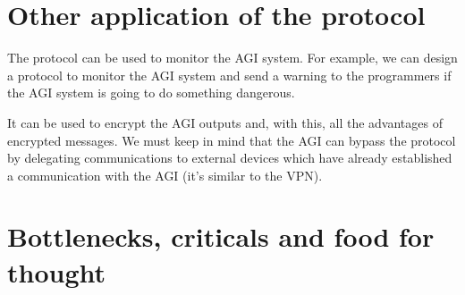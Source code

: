 \documentclass{article}
\begin{document}
\section{Other application of the protocol}
The protocol can be used to monitor the AGI system.
For example, we can design a protocol to monitor the AGI system and send a warning to the programmers if the AGI system is going to do something dangerous.

It can be used to encrypt the AGI outputs and, with this, all the advantages of encrypted messages.
We must keep in mind that the AGI can bypass the protocol by delegating communications to external devices which have already established a communication with the AGI (it's similar to the VPN).

\section{Bottlenecks, criticals and food for thought}
\end{document}
